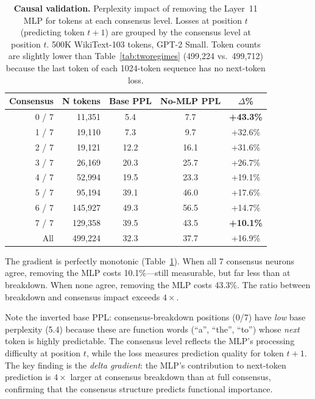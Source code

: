 \documentclass{article}
\begin{document}
\begin{table}[H]
\caption{\textbf{Causal validation.} Perplexity impact of removing the Layer~11 MLP for tokens
  at each consensus level. Losses at position $t$ (predicting token $t{+}1$) are grouped by
  the consensus level at position $t$. 500K WikiText-103 tokens, GPT-2 Small.
  Token counts are slightly lower than Table~\ref{tab:tworegimes} (499{,}224 vs.\ 499{,}712)
  because the last token of each 1024-token sequence has no next-token loss.}
\label{tab:causal}
\centering
\begin{tabular}{rrccc}
\toprule
Consensus & N tokens & Base PPL & No-MLP PPL & $\Delta$\% \\
\midrule
0 / 7 & 11,351  & 5.4   & 7.7   & \textbf{+43.3\%} \\
1 / 7 & 19,110  & 7.3   & 9.7   & +32.6\% \\
2 / 7 & 19,121  & 12.2  & 16.1  & +31.6\% \\
3 / 7 & 26,169  & 20.3  & 25.7  & +26.7\% \\
4 / 7 & 52,994  & 19.5  & 23.3  & +19.1\% \\
5 / 7 & 95,194  & 39.1  & 46.0  & +17.6\% \\
6 / 7 & 145,927 & 49.3  & 56.5  & +14.7\% \\
7 / 7 & 129,358 & 39.5  & 43.5  & \textbf{+10.1\%} \\
\midrule
All   & 499,224 & 32.3  & 37.7  & +16.9\% \\
\bottomrule
\end{tabular}
\end{table}

The gradient is perfectly monotonic (Table~\ref{tab:causal}). When all 7 consensus
neurons agree, removing the MLP costs 10.1\%---still measurable, but far less than at
breakdown. When none agree, removing the MLP costs 43.3\%. The ratio
between breakdown and consensus impact exceeds $4\times$.

Note the inverted base PPL: consensus-breakdown positions (0/7) have \emph{low} base perplexity
(5.4) because these are function words (``a'', ``the'', ``to'') whose \emph{next} token is
highly predictable. The consensus level reflects the MLP's processing difficulty at position
$t$, while the loss measures prediction quality for token $t{+}1$. The key finding is the
\emph{delta gradient}: the MLP's contribution to next-token prediction is $4\times$ larger
at consensus breakdown than at full consensus, confirming that the consensus structure
predicts functional importance.
\end{document}
